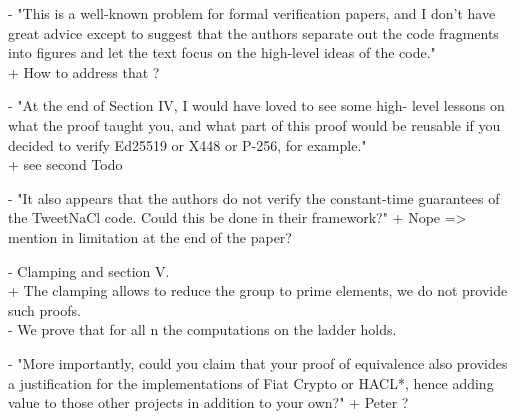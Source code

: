 {- "This is a well-known problem for formal
verification papers, and I don’t have great advice except to suggest
that the authors separate out the code fragments into figures and
let the text focus on the high-level ideas of the code."\\
+ How to address that ?

- "At the end of Section IV, I would have loved to see some high-
level lessons on what the proof taught you, and what part of this
proof would be reusable if you decided to verify Ed25519 or X448
or P-256, for example."\\
+ see second Todo

- "It also appears that the authors do not verify the constant-time
guarantees of the TweetNaCl code. Could this be done in their
framework?"
+ Nope => mention in limitation at the end of the paper?

- Clamping and section V.\\
+ The clamping allows to reduce the group to prime elements, we do not provide
such proofs.\\
- We prove that for all n the computations on the ladder holds.

- "More importantly, could you claim that your proof of equivalence also provides
a justification for the implementations of Fiat Crypto or HACL*, hence adding
value to those other projects in addition to your own?"
+ Peter ?
}
